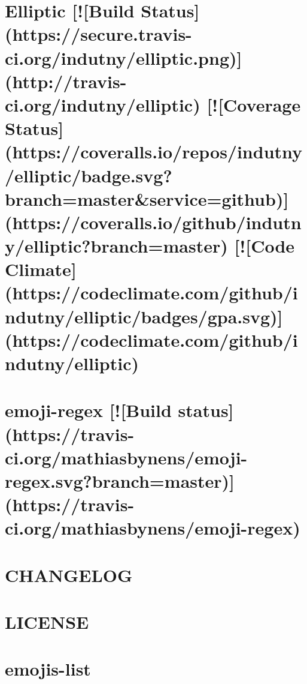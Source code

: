\documentclass[twoside]{book}
\newcommand{\+}{\discretionary{\mbox{\scriptsize$\hookleftarrow$}}{}{}}
\begin{document}
\chapter{Elliptic \mbox{[}!\mbox{[}Build Status\mbox{]}(https\+://secure.travis-\/ci.org/indutny/elliptic.png)\mbox{]}(http\+://travis-\/ci.org/indutny/elliptic) \mbox{[}!\mbox{[}Coverage Status\mbox{]}(https\+://coveralls.io/repos/indutny/elliptic/badge.svg?branch=master\&service=github)\mbox{]}(https\+://coveralls.io/github/indutny/elliptic?branch=master) \mbox{[}!\mbox{[}Code Climate\mbox{]}(https\+://codeclimate.com/github/indutny/elliptic/badges/gpa.svg)\mbox{]}(https\+://codeclimate.com/github/indutny/elliptic)}
\label{md__c_1_workspace_demo_src_main_script_node_modules_elliptic__r_e_a_d_m_e}

\chapter{emoji-\/regex \mbox{[}!\mbox{[}Build status\mbox{]}(https\+://travis-\/ci.org/mathiasbynens/emoji-\/regex.svg?branch=master)\mbox{]}(https\+://travis-\/ci.org/mathiasbynens/emoji-\/regex)}
\label{md__c_1_workspace_demo_src_main_script_node_modules_emoji-regex__r_e_a_d_m_e}

\chapter{C\+H\+A\+N\+G\+E\+L\+OG}
\label{md__c_1_workspace_demo_src_main_script_node_modules_emojis-list__c_h_a_n_g_e_l_o_g}

\chapter{L\+I\+C\+E\+N\+SE}
\label{md__c_1_workspace_demo_src_main_script_node_modules_emojis-list__l_i_c_e_n_s_e}

\chapter{emojis-\/list}
\label{md__c_1_workspace_demo_src_main_script_node_modules_emojis-list__r_e_a_d_m_e}

\end{document}
